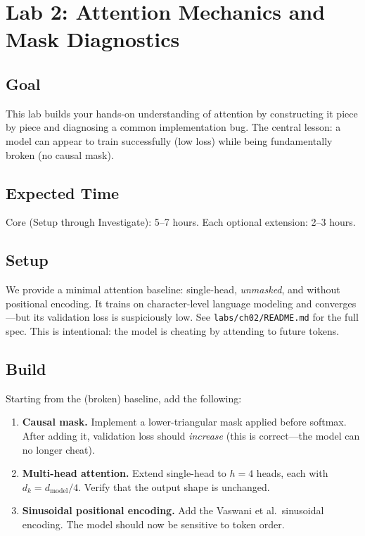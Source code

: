 \section*{Lab 2: Attention Mechanics and Mask Diagnostics}

\subsection*{Goal}

This lab builds your hands-on understanding of attention by constructing it piece by piece and diagnosing a common implementation bug. The central lesson: a model can appear to train successfully (low loss) while being fundamentally broken (no causal mask).

\subsection*{Expected Time}

Core (Setup through Investigate): 5--7 hours. Each optional extension: 2--3 hours.

\subsection*{Setup}

We provide a minimal attention baseline: single-head, \emph{unmasked},
and without positional encoding. It trains on character-level language
modeling and converges---but its validation loss is suspiciously low.
See \texttt{labs/ch02/README.md} for the full spec. This is intentional:
the model is cheating by attending to future tokens.

\subsection*{Build}

Starting from the (broken) baseline, add the following:

\begin{enumerate}
    \item \textbf{Causal mask.} Implement a lower-triangular mask applied before softmax. After adding it, validation loss should \emph{increase} (this is correct---the model can no longer cheat).
    \item \textbf{Multi-head attention.} Extend single-head to $h = 4$ heads, each with $d_k = d_{\text{model}} / 4$. Verify that the output shape is unchanged.
    \item \textbf{Sinusoidal positional encoding.} Add the Vaswani et al.\ sinusoidal encoding. The model should now be sensitive to token order.
\end{enumerate}

